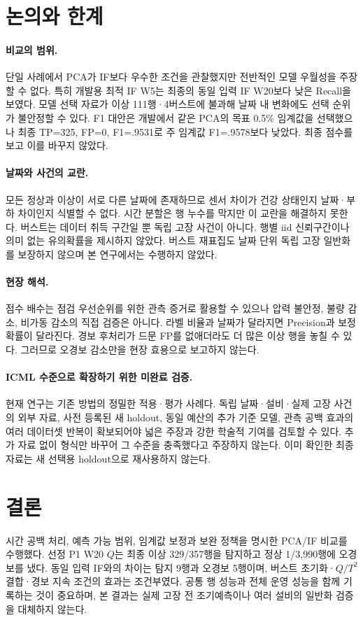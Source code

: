\documentclass{article}
\begin{document}
\section{논의와 한계}
\paragraph{비교의 범위.}
단일 사례에서 PCA가 IF보다 우수한 조건을 관찰했지만 전반적인 모델 우월성을 주장할 수 없다. 특히 개발용 최적 IF W5는 최종의 동일 입력 IF W20보다 낮은 Recall을 보였다. 모델 선택 자료가 이상 111행·4버스트에 불과해 날짜 내 변화에도 선택 순위가 불안정할 수 있다. F1 대안은 개발에서 같은 PCA의 목표 0.5\% 임계값을 선택했으나 최종 TP=325, FP=0, F1=.9531로 주 임계값 F1=.9578보다 낮았다. 최종 점수를 보고 이를 바꾸지 않았다.

\paragraph{날짜와 사건의 교란.}
모든 정상과 이상이 서로 다른 날짜에 존재하므로 센서 차이가 건강 상태인지 날짜·부하 차이인지 식별할 수 없다. 시간 분할은 행 누수를 막지만 이 교란을 해결하지 못한다. 버스트는 데이터 취득 구간일 뿐 독립 고장 사건이 아니다. 행별 iid 신뢰구간이나 의미 없는 유의확률을 제시하지 않았다. 버스트 재표집도 날짜 단위 독립 고장 일반화를 보장하지 않으며 본 연구에서는 수행하지 않았다.

\paragraph{현장 해석.}
점수 배수는 점검 우선순위를 위한 관측 증거로 활용할 수 있으나 압력 불안정, 불량 감소, 비가동 감소의 직접 검증은 아니다. 라벨 비율과 날짜가 달라지면 Precision과 보정 확률이 달라진다. 경보 후처리가 드문 FP를 없애더라도 더 많은 이상 행을 놓칠 수 있다. 그러므로 오경보 감소만을 현장 효용으로 보고하지 않는다.

\paragraph{ICML 수준으로 확장하기 위한 미완료 검증.}
현재 연구는 기존 방법의 정밀한 적용·평가 사례다. 독립 날짜·설비·실제 고장 사건의 외부 자료, 사전 등록된 새 holdout, 동일 예산의 추가 기준 모델, 관측 공백 효과의 여러 데이터셋 반복이 확보되어야 넓은 주장과 강한 학술적 기여를 검토할 수 있다. 추가 자료 없이 형식만 바꾸어 그 수준을 충족했다고 주장하지 않는다. 이미 확인한 최종 자료는 새 선택용 holdout으로 재사용하지 않는다.

\section{결론}
시간 공백 처리, 예측 가능 범위, 임계값 보정과 보완 정책을 명시한 PCA/IF 비교를 수행했다. 선정 P1 W20 $Q$는 최종 이상 329/357행을 탐지하고 정상 1/3,990행에 오경보를 냈다. 동일 입력 IF와의 차이는 탐지 9행과 오경보 5행이며, 버스트 초기화·$Q/T^2$ 결합·경보 지속 조건의 효과는 조건부였다. 공통 행 성능과 전체 운영 성능을 함께 기록하는 것이 중요하며, 본 결과는 실제 고장 전 조기예측이나 여러 설비의 일반화 검증을 대체하지 않는다.
\end{document}
